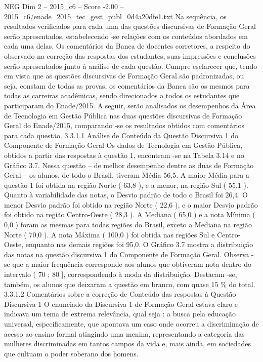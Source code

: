 \begin{textsample}{NEG Dim 2 – 2015\_c6 – Score -2.00 – 2015\_c6/enade\_2015\_tec\_gest\_publ\_0d4a20dfe1.txt}
Na sequência, os resultados verificados para cada uma das questões discursivas de Formação Geral serão apresentados, estabelecendo -se relações com os conteúdos abordados em cada uma delas.
Os comentários da Banca de docentes corretores, a respeito do observado na correção das respostas dos estudantes, suas impressões e conclusões serão apresentados junto à análise de cada questão.
Cumpre esclarecer que, tendo em vista que as questões discursivas de Formação Geral são padronizadas, ou seja, constam de todas as provas, os comentários da Banca são os mesmos para todas as carreiras acadêmicas, sendo direcionados a todos os estudantes que participaram do Enade/2015.
A seguir, serão analisados os desempenhos da Área de Tecnologia em Gestão Pública nas duas questões discursivas de Formação Geral do Enade/2015, comparando -se os resultados obtidos com comentários para cada questão. 3.3.1.1 Análise de Conteúdo da Questão Discursiva 1 do Componente de Formação Geral Os dados de Tecnologia em Gestão Pública, obtidos a partir das respostas à questão 1, encontram -se na Tabela 3.14 e no Gráfico 3.7.
Nessa questão – de melhor desempenho dentre as duas de Formação Geral – os alunos, de todo o Brasil, tiveram Média 56,5.
A maior Média para a questão 1 foi obtida na região Norte ( 63,8 ), e a menor, na região Sul ( 55,1 ).
Quanto à variabilidade das notas, o Desvio padrão de todo o Brasil foi 26,4.
O menor Desvio padrão foi obtido na região Norte ( 22,6 ), e o maior Desvio padrão foi obtido na região Centro-Oeste ( 28,3 ).
A Mediana ( 65,0 ) e a nota Mínima ( 0,0 ) foram as mesmas para todas regiões do Brasil, exceto a Mediana na região Norte ( 70,0 ).
A nota Máxima ( 100,0 ) foi obtida nas regiões Sul e Centro-Oeste, enquanto nas demais regiões foi 95,0.
O Gráfico 3.7 mostra a distribuição das notas na questão discursiva 1 do Componente de Formação Geral.
Observa -se que a maior frequência corresponde aos alunos que obtiveram nota dentro do intervalo ( 70 ; 80 ], correspondendo à moda da distribuição.
Destacam -se, também, os alunos que deixaram a questão em branco, com quase 15 \% do total. 3.3.1.2 Comentários sobre a correção de Conteúdo das respostas à Questão Discursiva 1 O enunciado da Discursiva 1 de Formação Geral estava claro e indicava um tema de extrema relevância, qual seja : a busca pela educação universal, especificamente, que apontava um caso onde ocorreu a discriminação de acesso ao ensino formal atingindo uma menina, representando a categoria das mulheres discriminadas em tantos campos da vida e, mais ainda, em sociedades que cultuam o poder soberano dos homens.

\end{textsample}
